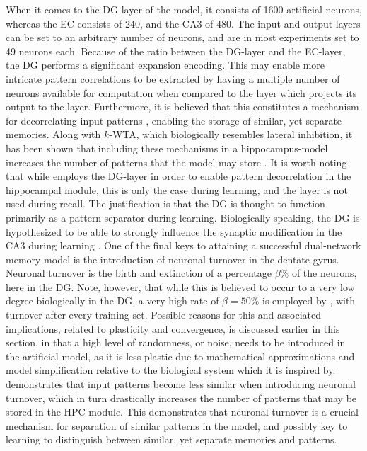 When it comes to the DG-layer of the model, it consists of 1600 artificial neurons, whereas the EC consists of 240, and the CA3 of 480. The input and output layers can be set to an arbitrary number of neurons, and are in most experiments set to 49 neurons each. Because of the ratio between the DG-layer and the EC-layer, the DG performs a significant expansion encoding. This may enable more intricate pattern correlations to be extracted by having a multiple number of neurons available for computation when compared to the layer which projects its output to the layer. Furthermore, it is believed that this constitutes a mechanism for decorrelating input patterns \citep{Rolls1998chpt2}, enabling the storage of similar, yet separate memories. Along with $k$-WTA, which biologically resembles lateral inhibition, it has been shown that including these mechanisms in a hippocampus-model increases the number of patterns that the model may store \citep{Wakagi2008, Hattori2014}. It is worth noting that while \cite{Hattori2014} employs the DG-layer in order to enable pattern decorrelation in the hippocampal module, this is only the case during learning, and the layer is not used during recall. The justification is that the DG is thought to function primarily as a pattern separator during learning. Biologically speaking, the DG is hypothesized to be able to strongly influence the synaptic modification in the CA3 during learning \citep{Rolls1998chpt6}.
One of the final keys to attaining a successful dual-network memory model is the introduction of neuronal turnover in the dentate gyrus. Neuronal turnover is the birth and extinction of a percentage $\beta \%$ of the neurons, here in the DG. Note, however, that while this is believed to occur to a very low degree biologically in the DG, a very high rate of $\beta = 50 \%$ is employed by \cite{Hattori2014}, with turnover after every training set. Possible reasons for this and associated implications, related to plasticity and convergence, is discussed earlier in this section, in that a high level of randomness, or noise, needs to be introduced in the artificial model, as it is less plastic due to mathematical approximations and model simplification relative to the biological system which it is inspired by. \cite{Hattori2014} demonstrates that input patterns become less similar when introducing neuronal turnover, which in turn drastically increases the number of patterns that may be stored in the HPC module. This demonstrates that neuronal turnover is a crucial mechanism for separation of similar patterns in the model, and possibly key to learning to distinguish between similar, yet separate memories and patterns.

